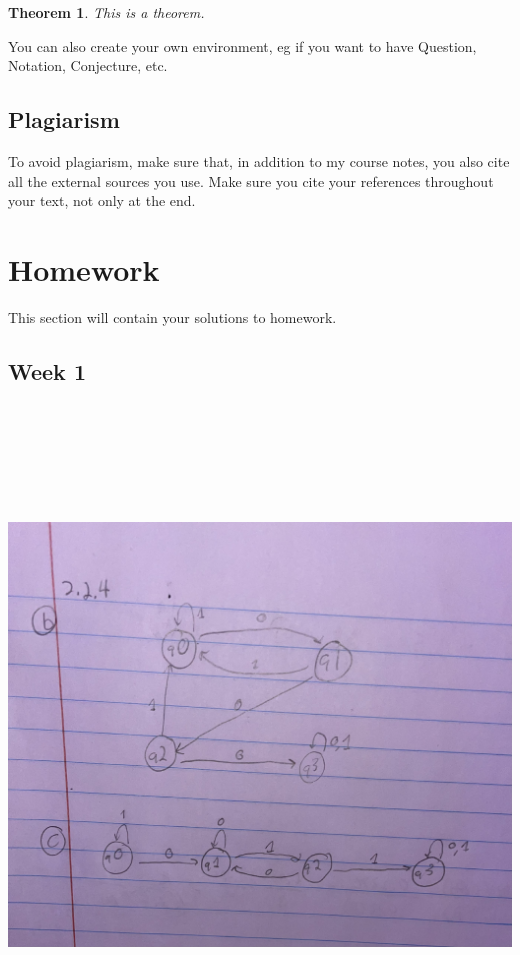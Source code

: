 \documentclass{article}
\theoremstyle{theorem}
\newtheorem{theorem}{Theorem}[section]
\theoremstyle{definition}
\theoremstyle{remark}
\begin{document}
\begin{theorem}
This is a theorem.
\end{theorem}

\noindent You can also create your own environment, eg if you want to have Question, Notation, Conjecture, etc.

\subsection{Plagiarism}

To avoid plagiarism, make sure that, in addition to my course notes, you also cite all the external sources you use. Make sure you cite your references throughout your text, not only at the end.

\section{Homework}\label{homework}

This section will contain your solutions to homework. 

\subsection{Week 1}

\medskip\begin{center}
\includegraphics[width=15cm, height=17.5cm]{Week1.pdf}
\end{center}
\end{document}
